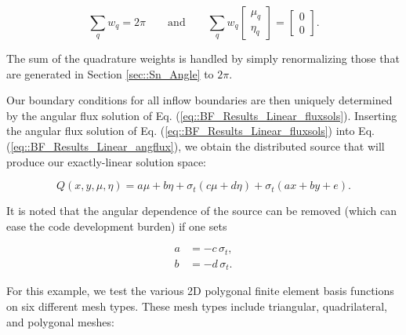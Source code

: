 \begin{equation}
\label{eq::BF_Results_Linear_quadrules}
\sum_{q} w_q = 2 \pi \qquad \text{and} \qquad \sum_{q} w_q  \left[
	\begin{array}{c}
		\mu_q \\
		\eta_q
	\end{array} \right] = \left[
	\begin{array}{c}
		0 \\
		0
	\end{array} \right] .
\end{equation}

\noindent The sum of the quadrature weights is handled by simply renormalizing those that are generated in Section \ref{sec::Sn_Angle} to $2 \pi$.

Our boundary conditions for all inflow boundaries are then uniquely determined by the angular flux solution of Eq. (\ref{eq::BF_Results_Linear_fluxsols}). Inserting the angular flux solution of Eq. (\ref{eq::BF_Results_Linear_fluxsols}) into Eq. (\ref{eq::BF_Results_Linear_angflux}), we obtain the distributed source that will produce our exactly-linear solution space:

\begin{equation}
\label{eq::BF_Results_Linear_src}
Q(x,y,\mu,\eta) = a \mu + b \eta + \sigma_t \left(  c \mu + d \eta \right) + \sigma_t \left( ax +by + e   \right).
\end{equation}

\noindent It is noted that the angular dependence of the source can be removed (which can ease the code development burden) if one sets

\begin{equation}
\label{eq::BF_Results_Linear_removeterms}
\begin{aligned}
	a &= - c \, \sigma_t, \\
	b &= - d \, \sigma_t.
\end{aligned}
\end{equation}

For this example, we test the various 2D polygonal finite element basis functions on six different mesh types. These mesh types include triangular, quadrilateral, and polygonal meshes:

